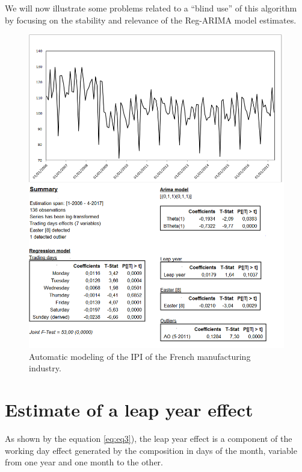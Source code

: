\documentclass[12pt, a4paper]{article}
\begin{document}
We will now illustrate some problems related to a ``blind use'' of this algorithm by focusing on the stability and relevance of the Reg-ARIMA model estimates.

\begin{figure}[!ht]
\begin{center}
 \includegraphics[scale=0.7]{img/IPImanuf.png}
 \caption[Automatic modeling of the IPI of the French manufacturing industry]{Automatic modeling of the IPI of the French manufacturing industry.}
 \label{fig:IPI}
\end{center}
\end{figure}

\clearpage

\section{Estimate of a leap year effect}
\label{sec:LY}

As shown by the equation \ref{eq:eq3}), the leap year effect is a component of the working day effect generated by the composition in days of the month, variable from one year and one month to the other.
\end{document}
